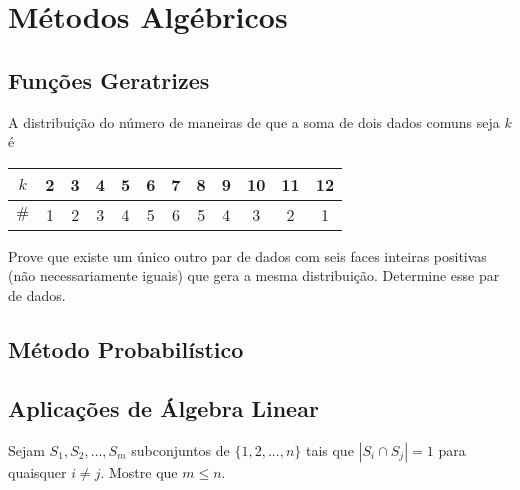 \chapter{Métodos Algébricos}

\section{Funções Geratrizes}

\begin{prob}
	A distribuição do número de maneiras de que a soma de dois dados comuns seja $k$ é

	\begin{center}
	\begin{tabular}{c|c|c|c|c|c|c|c|c|c|c|c}
		$k$  & 2 & 3 & 4 & 5 & 6 & 7 & 8 & 9 &10 &11 &12 \\\hline
		$\#$ & 1 & 2 & 3 & 4 & 5 & 6 & 5 & 4 & 3 & 2 & 1
	\end{tabular}
	\end{center}

	Prove que existe um único outro par de dados com seis faces inteiras positivas (não necessariamente iguais) que gera a mesma distribuição. Determine esse par de dados.
\end{prob}

\section{Método Probabilístico}

\section{Aplicações de Álgebra Linear}

\begin{prob}
	Sejam $S_1, S_2, \dots, S_m$ subconjuntos de $\{1, 2, ..., n\}$ tais que $|S_i \cap S_j| = 1$ para quaisquer $i \neq j$. Mostre que $m \le n$.
\end{prob}
